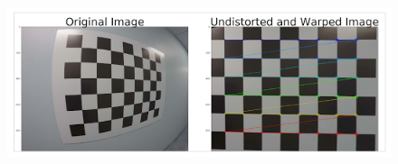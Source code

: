 \documentclass[12pt]{article}
\begin{document}
\begin{figure}[htp]
    \centering
    \includegraphics[width=15cm]{undistorted_warped_img.png}
    \label{fig:undistorted_warped_img}
\end{figure}
\end{document}
